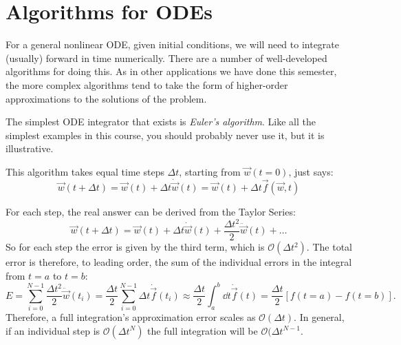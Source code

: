 \section{Algorithms for ODEs}

For a general nonlinear ODE, given initial conditions, we will need to
integrate (usually) forward in time numerically. There are a number of
well-developed algorithms for doing this. As in other applications we
have done this semester, the more complex algorithms tend to take the
form of higher-order approximations to the solutions of the problem. 

The simplest ODE integrator that exists is {\it Euler's algorithm}.
Like all the simplest examples in this course, you should probably
never use it, but it is illustrative.

This algorithm takes equal time steps $\Delta t$, starting from
$\vec{w}(t=0)$, just says:
\begin{equation}
\vec{w}(t+\Delta t) = \vec{w}(t) + \Delta t {\dot{\vec{w}}}(t) = 
\vec{w}(t) + \Delta t \vec{f}(\vec{w}, t)
\end{equation}



\begin{answer}
  For each step, the real answer can be derived from the Taylor Series:
  \begin{equation}
    \vec{w}(t+\Delta t) = \vec{w}(t) + \Delta t {\dot{\vec{w}}}(t)
    + \frac{\Delta t^2}{2} \ddot{\vec{w}}(t) + \ldots
  \end{equation}
  So for each step the error is given by the third term, which is
  $\mathcal{O}(\Delta t^2)$. The total error is therefore, to leading
  order, the sum of the individual errors in the integral from $t=a$
  to $t=b$:
  \begin{equation}
    E = \sum_{i=0}^{N-1} \frac{\Delta t^2}{2} \ddot{\vec{w}}(t_i)
     = \frac{\Delta t}{2} \sum_{i=0}^{N-1} \Delta t \dot{\vec{f}}(t_i)
     \approx \frac{\Delta t}{2} \int_a^b \dd{t} \dot{\vec{f}}(t)
     = \frac{\Delta t}{2} \left[ f(t=a) - f(t=b)\right].
  \end{equation}
  Therefore, a full integration's approximation error scales as
  $\mathcal{O}(\Delta t)$. In general, if an individual step is
  $\mathcal{O}(\Delta t^N)$ the full integration will be
  $\mathcal{O}(\Delta t^{N-1}$.
\end{answer}

